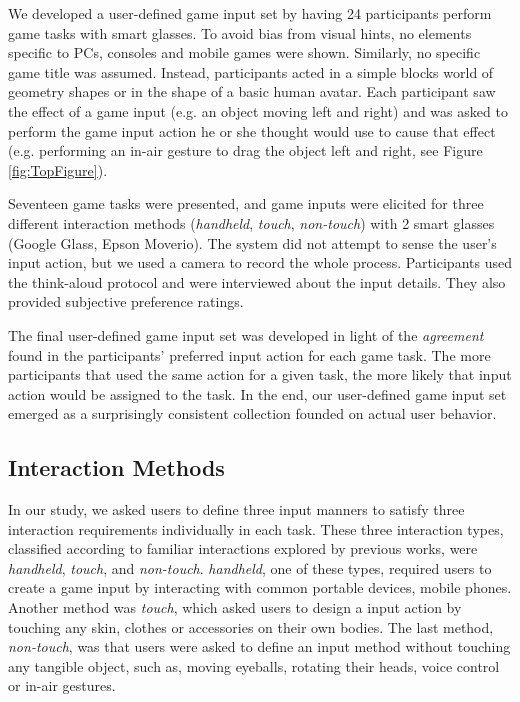 \documentclass{sigchi}
\begin{document}
    We developed a user-defined game input set by having 24 participants perform game tasks with smart glasses. To avoid bias from visual hints\cite{Epps:2006:SHS:1125451.1125601}, no elements specific to PCs, consoles and mobile games were shown. Similarly, no specific game title was assumed. Instead, participants acted in a simple blocks world of geometry shapes or in the shape of a basic human avatar. Each participant saw the effect of a game input (e.g. an object moving left and right) and was asked to perform the game input action he or she thought would use to cause that effect (e.g. performing an in-air gesture to drag the object left and right, see Figure \ref{fig:TopFigure}). 

    Seventeen game tasks were presented, and game inputs were elicited for three different interaction methods (\emph{handheld}, \emph{touch}, \emph{non-touch}) with 2 smart glasses (Google Glass, Epson Moverio). The system did not attempt to sense the user's input action, but we used a camera to record the whole process. Participants used the think-aloud protocol and were interviewed about the input details. They also provided subjective preference ratings.

    The final user-defined game input set was developed in light of the \textsl{agreement} found in the participants' preferred input action for each game task. The more participants that used the same action for a given task, the more likely that input action would be assigned to the task. In the end, our user-defined game input set emerged as a surprisingly consistent collection founded on actual user behavior.

    \subsection {Interaction Methods}
    In our study, we asked users to define three input manners to satisfy three interaction requirements individually in each task. These three interaction types, classified according to familiar interactions explored by previous works, were \textsl{handheld}, \textsl{touch}, and \textsl{non-touch}. \textsl{handheld}, one of these types, required users to create a game input by interacting with common portable devices, mobile phones. Another method was \textsl{touch}, which asked users to design a input action by touching any skin, clothes or accessories on their own bodies. The last method, \textsl{non-touch}, was that users were asked to define an input method without touching any tangible object, such as, moving eyeballs, rotating their heads, voice control or in-air gestures. 
\end{document}
